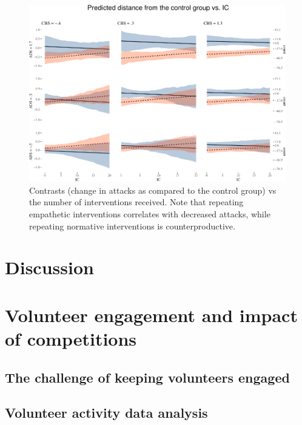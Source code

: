\documentclass[preprint,12pt]{elsarticle}
\begin{document}
\begin{figure}

\begin{center}\includegraphics[width=1\linewidth]{ figures/visICPlot-1} \end{center}
\caption{Contrasts (change in attacks as compared to the control group) vs the number
of interventions received. Note that repeating empathetic interventions
correlates with decreased attacks, while repeating normative interventions
is counterproductive.}
\label{fig:ContrastsIC}
\end{figure}



\section{Discussion}














\section{Volunteer engagement and impact of competitions}


\subsection{The challenge of keeping volunteers engaged}


\subsection{Volunteer activity  data analysis}
\end{document}
